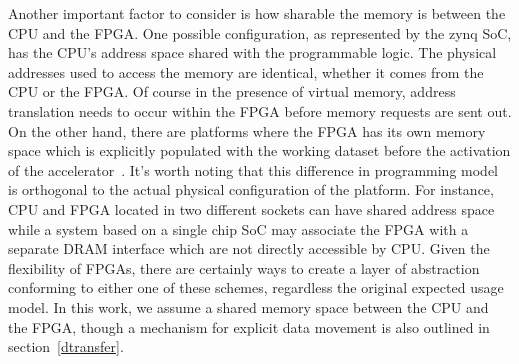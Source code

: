 Another important factor to consider is how sharable the memory
is between the CPU and the FPGA. 
One possible configuration, as represented by the zynq SoC, has
the CPU's address space shared with the programmable logic.
The physical addresses used to access the memory are identical,
whether it comes from the CPU or the FPGA. Of course in the presence
of virtual memory, address translation needs to occur within the FPGA
before memory requests are sent out. On the other hand, there are
platforms where the FPGA has its own memory space which is
explicitly populated with the working dataset before the activation of 
the accelerator~\cite{sdaccel}. It's worth noting that this difference in programming model
is orthogonal to the actual physical configuration of the platform. For instance, CPU and FPGA located in two different sockets can have shared address space while a system based on a single chip SoC may associate the FPGA with a separate DRAM interface which are not directly
accessible by CPU. 
Given the flexibility of FPGAs, there are certainly ways to create a layer of abstraction conforming to either one of these schemes, regardless
the original expected usage model. 
In this work, we assume a shared memory space between the CPU and the FPGA, 
though a mechanism for explicit data movement is also outlined in section~\ref{dtransfer}.





